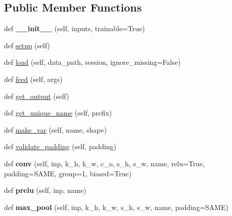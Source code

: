 \subsection*{Public Member Functions}
\begin{DoxyCompactItemize}
\item 
def {\bfseries \+\_\+\+\_\+init\+\_\+\+\_\+} (self, inputs, trainable=True)\hypertarget{classdetect__face_1_1Network_a69f8b4b309d9f5402ccb86f73a34d807}{}\label{classdetect__face_1_1Network_a69f8b4b309d9f5402ccb86f73a34d807}

\item 
def \hyperlink{classdetect__face_1_1Network_ac19da11c9d5136399bee1c5b2468be79}{setup} (self)
\item 
def \hyperlink{classdetect__face_1_1Network_a26cf4112c7a92cc8d03e74e690c6831d}{load} (self, data\+\_\+path, session, ignore\+\_\+missing=False)
\item 
def \hyperlink{classdetect__face_1_1Network_a810da0416a4cd84e83015d89131d4389}{feed} (self, args)
\item 
def \hyperlink{classdetect__face_1_1Network_a4a6eb7a13da3620697a64f7a974242e8}{get\+\_\+output} (self)
\item 
def \hyperlink{classdetect__face_1_1Network_aa6ee08c64a7f8a75ac13a485a8ed3374}{get\+\_\+unique\+\_\+name} (self, prefix)
\item 
def \hyperlink{classdetect__face_1_1Network_a4ee4b07dc43c4092f4c1b63d89296057}{make\+\_\+var} (self, name, shape)
\item 
def \hyperlink{classdetect__face_1_1Network_a8f407ab687e3a91324e0b54b9011672a}{validate\+\_\+padding} (self, padding)
\item 
def {\bfseries conv} (self, inp, k\+\_\+h, k\+\_\+w, c\+\_\+o, s\+\_\+h, s\+\_\+w, name, relu=True, padding=\textquotesingle{}S\+A\+ME\textquotesingle{}, group=1, biased=True)\hypertarget{classdetect__face_1_1Network_a3f5730dec069754ebd608eedf81669ed}{}\label{classdetect__face_1_1Network_a3f5730dec069754ebd608eedf81669ed}

\item 
def {\bfseries prelu} (self, inp, name)\hypertarget{classdetect__face_1_1Network_a6ab3ca1c0884bacf4bc4fd608ed766fd}{}\label{classdetect__face_1_1Network_a6ab3ca1c0884bacf4bc4fd608ed766fd}

\item 
def {\bfseries max\+\_\+pool} (self, inp, k\+\_\+h, k\+\_\+w, s\+\_\+h, s\+\_\+w, name, padding=\textquotesingle{}S\+A\+ME\textquotesingle{})\hypertarget{classdetect__face_1_1Network_a1ef26550a38cce16c26d5b8858a6864f}{}\label{classdetect__face_1_1Network_a1ef26550a38cce16c26d5b8858a6864f}


\end{DoxyCompactItemize}
